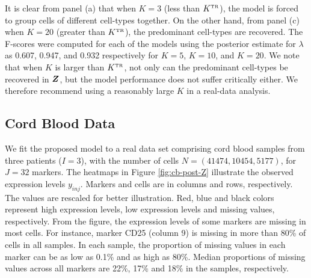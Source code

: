 \documentclass[12pt,]{article}
\newcommand{\true}{{\mbox{\tiny TR}}}
\newcommand{\bZ}{\mbox{\boldmath $Z$}}
\begin{document}
It is clear from panel (a) that when $K=3$ (less than $K^\true$), the model is
forced to group cells of different cell-types together. On the other hand, 
from panel (c) when $K=20$ (greater than $K^\true$), the predominant cell-types
are recovered. 
The F-scores were computed for each of the models using the posterior estimate
for $\lambda$ as 0.607, 0.947, and 0.932 respectively for $K=5$, $K=10$, and
$K=20$. We note that when $K$ is larger than $K^\true$, not only can the
predominant cell-types be recovered in $\bZ$, but the model performance does
not suffer critically either. We therefore recommend using a reasonably large
$K$ in a real-data analysis.


\subsection{Cord Blood Data}\label{sec:CB-real}
We fit the proposed model to a real data set comprising cord blood samples from
three patients ($I=3$), with the number of cells $N=(41474, 10454, 5177)$, for
$J=32$ markers. The heatmaps in Figure \ref{fig:cb-post-Z} illustrate the
observed expression levels $y_{inj}$.  Markers and cells are in columns and
rows, respectively. The values are rescaled for better illustration.  Red, blue
and black colors represent high expression levels, low expression levels and
missing values, respectively.  From the figure, the expression levels of some
markers are missing in most cells. For instance, marker CD25 (column 9) is
missing in more than 80\% of cells in all samples.
In each sample, the proportion of missing values in each marker can be as low
as 0.1\% and as high as 80\%.  Median proportions of missing values across all
markers are 22\%, 17\% and 18\% in the samples, respectively.
\end{document}
